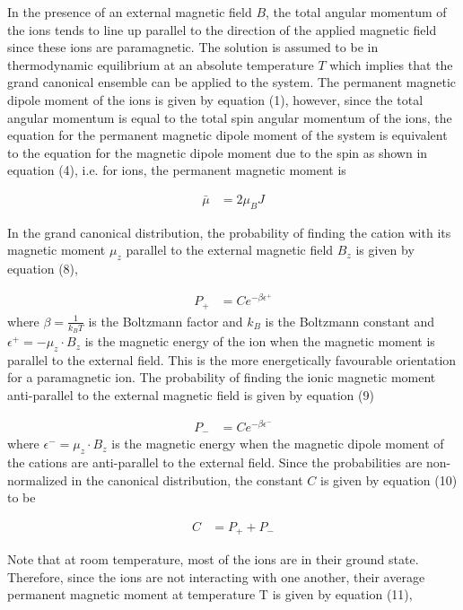 \documentclass[a4paper,11pt]{article}
\begin{document}
In the presence of an external magnetic field $B$, the total angular momentum of the  ions tends to line up parallel to the direction of the applied magnetic field since these ions are paramagnetic\cite{mohling1982}. The solution is assumed to be in thermodynamic equilibrium at an absolute temperature $T$ which implies that the grand canonical ensemble can be applied to the system\cite{pellicane2018}. The permanent magnetic dipole moment of the  ions is given by equation (1), however, since the total angular momentum is equal to the total spin angular momentum of the ions, the equation for the permanent magnetic dipole moment of the system is equivalent to the equation for the magnetic dipole moment due to the spin as shown in equation (4), i.e. for  ions, the permanent magnetic moment is 

\begin{align}
\bar{\mu}	& = 2 \mu_B J\nonumber 
\end{align}

In the grand canonical distribution, the probability of finding the cation with its magnetic moment $\mu_z$ parallel to the external magnetic field $B_z$ is given by equation (8),

\begin{align}
P_+	& = Ce^{-\beta \epsilon^{+}}
\end{align}
where $\beta = \frac{1}{k_B T}$ is the Boltzmann factor and $k_B$ is the Boltzmann constant and $\epsilon^{+} = - \mu_z \cdot B_z$ is the magnetic energy of the ion when the magnetic moment is parallel to the external field. This is the more energetically favourable orientation for a paramagnetic ion. The probability of finding the ionic magnetic moment anti-parallel to the external magnetic field is given by equation (9)

\begin{align}
P_-	& = Ce^{-\beta \epsilon^{-}}
\end{align}
where $\epsilon^{-} = \mu_z \cdot B_z$ is the magnetic energy when the magnetic dipole moment of the cations are anti-parallel to the external field. Since the probabilities are non-normalized in the canonical distribution, the constant $C$ is given by equation (10) to be

\begin{align}
C	& = P_+ + P_-
\end{align}

Note that at room temperature, most of the ions are in their ground state\cite{mohling1982}. Therefore, since the ions are not interacting with one another, their average permanent magnetic moment at temperature T is given by equation (11), 
\end{document}
